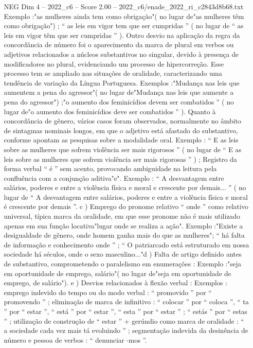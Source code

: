 \begin{textsample}{NEG Dim 4 – 2022\_c6 – Score 2.00 – 2022\_c6/enade\_2022\_ri\_c2843d8b68.txt}
Exemplo :"as mulheres ainda tem como obrigação"( no lugar de"as mulheres têm como obrigação") ; “ as leis em vigor tem que ser cumpridas ” ( no lugar de “ as leis em vigor têm que ser cumpridas ” ).
Outro desvio na aplicação da regra da concordância de número foi o aparecimento da marca de plural em verbos ou adjetivos relacionados a núcleos substantivos no singular, devido à presença de modificadores no plural, evidenciando um processo de hipercorreção.
Esse processo tem se ampliado nas situações de oralidade, caracterizando uma tendência de variação da Língua Portuguesa.
Exemplos :"Mudança nas leis que aumentem a pena do agressor"( no lugar de"Mudança nas leis que aumente a pena do agressor") ;"o aumento dos feminicídios devem ser combatidos ” ( no lugar de"o aumento dos feminicídios deve ser combatidos ” ).
Quanto à concordância de gênero, vários casos foram observados, normalmente no âmbito de sintagmas nominais longos, em que o adjetivo está afastado do substantivo, conforme apontam as pesquisas sobre a modalidade oral.
Exemplo : “ E as leis sobre as mulheres que sofrem violência ser mais rigorosos ” ( no lugar de “ E as leis sobre as mulheres que sofrem violência ser mais rigorosas ” ) ; Registro da forma verbal “ é ” sem acento, provocando ambiguidade na leitura pela confluência com a conjunção aditiva"e".
Exemplo : “ A desvantagem entre salários, poderes e entre a violência física e moral e crescente por demais... ” ( no lugar de “ A desvantagem entre salários, poderes e entre a violência física e moral é crescente por demais ”. c ) Emprego do pronome relativo “ onde ” como relativo universal, típica marca da oralidade, em que esse pronome não é mais utilizado apenas em sua função locativa"lugar onde se realiza a ação".
Exemplo :"Existe a desigualdade de gênero, onde homem ganha mais do que as mulheres"; “ há falta de informação e conhecimento onde ” ; “ O patriarcado está estruturado em nossa sociedade há séculos, onde o sexo masculino..."d ) Falta de artigo definido antes de substantivo, comprometendo o paralelismo em enumerações : Exemplo :"seja em oportunidade de emprego, salário"( no lugar de"seja em oportunidade de emprego, de salário"). e ) Desvios relacionados à flexão verbal : Exemplos : emprego indevido do tempo ou do modo verbal : “ promovido ” por “ promovendo ” ; eliminação de marca de infinitivo : “ colocar ” por “ coloca ”, “ ta ” por “ estar ”, “ está ” por “ estar ”, “ esta ” por “ estar ” ; “ estás ” por “ estas ” ; utilização de construção de “ estar ” + gerúndio como marca de oralidade : “ a sociedade cada vez mais tá evoluindo ” ; segmentação indevida da desinência de número e pessoa de verbos : “ denunciar -mos ”.

\end{textsample}
